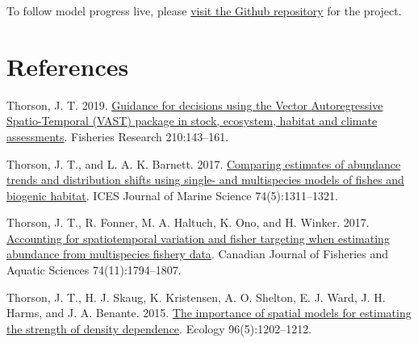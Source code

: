 \documentclass[
]{article}
\newlength{\cslhangindent}
\newlength{\cslentryspacingunit} %
\newenvironment{CSLReferences}[2] %
 {%
  \setlength{\parindent}{0pt}
  \ifodd #1
  \let\oldpar\par
  \def\par{\hangindent=\cslhangindent\oldpar}
  \fi
  \setlength{\parskip}{#2\cslentryspacingunit}
 }%
 {}
\begin{document}
To follow model progress live, please \href{https://github.com/Northeast-Climate-Integrated-Modeling/Atlantic-Bluefin-Tuna-Climate-Informed-Stock-Assessment}{visit the Github repository} for the project.

\hypertarget{references}{%
\section*{References}\label{references}}

\hypertarget{refs}{}
\begin{CSLReferences}{1}{0}
\leavevmode{}%
Thorson, J. T. 2019. \href{https://doi.org/10.1016/j.fishres.2018.10.013}{Guidance for decisions using the {Vector} {Autoregressive} {Spatio}-{Temporal} ({VAST}) package in stock, ecosystem, habitat and climate assessments}. Fisheries Research 210:143--161.

\leavevmode{}%
Thorson, J. T., and L. A. K. Barnett. 2017. \href{https://doi.org/10.1093/icesjms/fsw193}{Comparing estimates of abundance trends and distribution shifts using single- and multispecies models of fishes and biogenic habitat}. ICES Journal of Marine Science 74(5):1311--1321.

\leavevmode{}%
Thorson, J. T., R. Fonner, M. A. Haltuch, K. Ono, and H. Winker. 2017. \href{https://doi.org/10.1139/cjfas-2015-0598}{Accounting for spatiotemporal variation and fisher targeting when estimating abundance from multispecies fishery data}. Canadian Journal of Fisheries and Aquatic Sciences 74(11):1794--1807.

\leavevmode{}%
Thorson, J. T., H. J. Skaug, K. Kristensen, A. O. Shelton, E. J. Ward, J. H. Harms, and J. A. Benante. 2015. \href{https://doi.org/10.1890/14-0739.1}{The importance of spatial models for estimating the strength of density dependence}. Ecology 96(5):1202--1212.

\end{CSLReferences}
\end{document}
